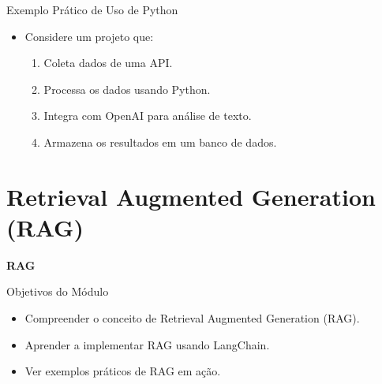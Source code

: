 \documentclass{beamer}
\begin{document}
\begin{frame}{Exemplo Prático de Uso de Python}
\begin{itemize}
    \item Considere um projeto que:
    \begin{enumerate}
        \item Coleta dados de uma API.
        \item Processa os dados usando Python.
        \item Integra com OpenAI para análise de texto.
        \item Armazena os resultados em um banco de dados.
    \end{enumerate}
\end{itemize}
   \centering
{}
\end{frame}

\section{Retrieval Augmented Generation (RAG)}
\begin{frame}
\centering
\Huge
\textbf{RAG}
\end{frame}

\begin{frame}{Objetivos do Módulo}
\begin{itemize}
    \item Compreender o conceito de Retrieval Augmented Generation (RAG).
        \item Aprender a implementar RAG usando LangChain.
    \item Ver exemplos práticos de RAG em ação.
\end{itemize}
\end{frame}
\end{document}
